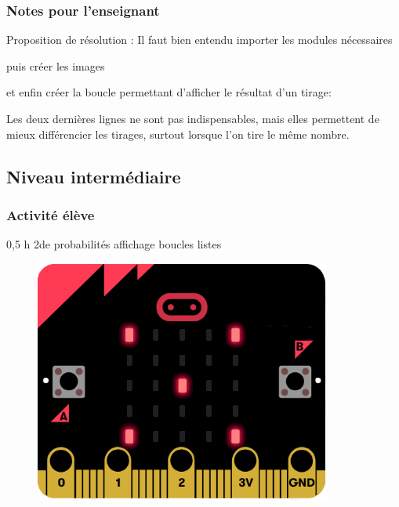 \subsubsection{Notes pour l'enseignant}

%
%
\begin{methode}
Proposition de résolution :
Il faut bien entendu importer les modules nécessaires

puis créer les images


et enfin créer la boucle permettant d'afficher le résultat d'un tirage:
\end{methode}


\begin{remarque}
   Les deux dernières lignes ne sont pas indispensables, mais elles permettent de mieux différencier les tirages, surtout lorsque l'on tire le même nombre.
\end{remarque}


%
%

\newpage

\subsection{Niveau intermédiaire}

\subsubsection{Activité élève}

\cartouche
{0,5 h}         %
{2de}           %
{probabilités}        %
{}     %
{affichage boucles listes }       %


\begin{figure}
    \includegraphics[width=\linewidth]{res/mbpy-de.png}
\end{figure}

